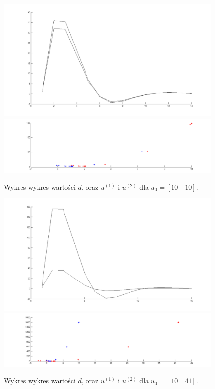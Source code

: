 \documentclass[a4paper,10pt]{article}
\begin{document}
\begin{figure}[!h]
    \centering
	\includegraphics[width=120mm]{CW4-alg3fun1-u10_10-k01-d.png}
	\includegraphics[width=120mm]{CW4-alg3fun1-u10_10-k01-u.png}
	\caption{Wykres wykres wartości $d$, oraz $u^{(1)}$ i $u^{(2)}$ dla $u_0=[10 \quad 10]$.}
    \label{fig:Rysunek}
\end{figure}
\begin{figure}[!h]
    \centering
	\includegraphics[width=120mm]{CW4-alg3fun1-u10_41-k01-d.png}
	\includegraphics[width=120mm]{CW4-alg3fun1-u10_41-k01-u.png}
	\caption{Wykres wykres wartości $d$, oraz $u^{(1)}$ i $u^{(2)}$ dla $u_0=[10 \quad 41]$.}
    \label{fig:Rysunek}
\end{figure}
\end{document}
